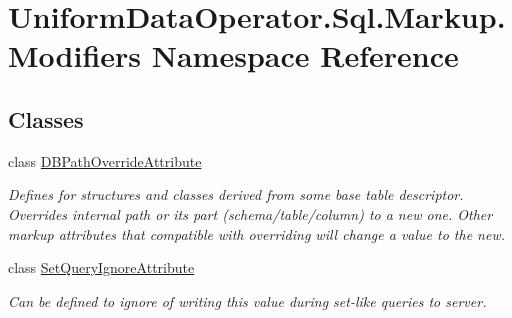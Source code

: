 \hypertarget{namespace_uniform_data_operator_1_1_sql_1_1_markup_1_1_modifiers}{}\section{Uniform\+Data\+Operator.\+Sql.\+Markup.\+Modifiers Namespace Reference}
\label{namespace_uniform_data_operator_1_1_sql_1_1_markup_1_1_modifiers}
\subsection*{Classes}
\begin{DoxyCompactItemize}
\item 
class \mbox{\hyperlink{class_uniform_data_operator_1_1_sql_1_1_markup_1_1_modifiers_1_1_d_b_path_override_attribute}{D\+B\+Path\+Override\+Attribute}}
\begin{DoxyCompactList}\small\item\em Defines for structures and classes derived from some base table descriptor. Overrides internal path or its part (schema/table/column) to a new one. Other markup attributes that compatible with overriding will change a value to the new. \end{DoxyCompactList}\item 
class \mbox{\hyperlink{class_uniform_data_operator_1_1_sql_1_1_markup_1_1_modifiers_1_1_set_query_ignore_attribute}{Set\+Query\+Ignore\+Attribute}}
\begin{DoxyCompactList}\small\item\em Can be defined to ignore of writing this value during set-\/like queries to server. \end{DoxyCompactList}\end{DoxyCompactItemize}
